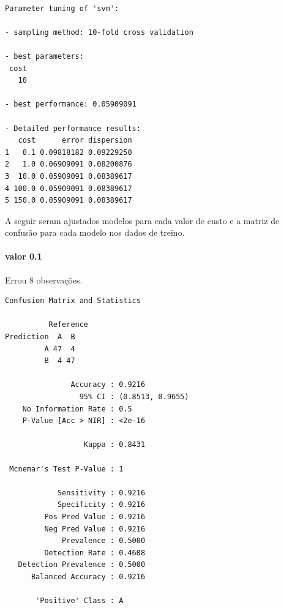 \documentclass[
  a4paperpaper,
]{article}
\let\oldparagraph\paragraph
\renewcommand{\paragraph}[1]{\oldparagraph{#1}\mbox{}}
\newenvironment{Shaded}{\begin{snugshade}}{\end{snugshade}}
\newcommand{\AttributeTok}[1]{\textcolor[rgb]{0.40,0.45,0.13}{#1}}
\newcommand{\FloatTok}[1]{\textcolor[rgb]{0.68,0.00,0.00}{#1}}
\newcommand{\FunctionTok}[1]{\textcolor[rgb]{0.28,0.35,0.67}{#1}}
\newcommand{\NormalTok}[1]{\textcolor[rgb]{0.00,0.23,0.31}{#1}}
\newcommand{\OtherTok}[1]{\textcolor[rgb]{0.00,0.23,0.31}{#1}}
\newcommand{\SpecialCharTok}[1]{\textcolor[rgb]{0.37,0.37,0.37}{#1}}
\newcommand{\StringTok}[1]{\textcolor[rgb]{0.13,0.47,0.30}{#1}}
\begin{document}
\begin{verbatim}

Parameter tuning of 'svm':

- sampling method: 10-fold cross validation 

- best parameters:
 cost
   10

- best performance: 0.05909091 

- Detailed performance results:
   cost      error dispersion
1   0.1 0.09818182 0.09229250
2   1.0 0.06909091 0.08200876
3  10.0 0.05909091 0.08389617
4 100.0 0.05909091 0.08389617
5 150.0 0.05909091 0.08389617
\end{verbatim}

A seguir seram ajustados modelos para cada valor de custo e a matriz de
confusão para cada modelo nos dados de treino.

\paragraph{valor 0.1}\label{valor-0.1}

Errou 8 observações.

\begin{Shaded}
\end{Shaded}

\begin{verbatim}
Confusion Matrix and Statistics

          Reference
Prediction  A  B
         A 47  4
         B  4 47
                                          
               Accuracy : 0.9216          
                 95% CI : (0.8513, 0.9655)
    No Information Rate : 0.5             
    P-Value [Acc > NIR] : <2e-16          
                                          
                  Kappa : 0.8431          
                                          
 Mcnemar's Test P-Value : 1               
                                          
            Sensitivity : 0.9216          
            Specificity : 0.9216          
         Pos Pred Value : 0.9216          
         Neg Pred Value : 0.9216          
             Prevalence : 0.5000          
         Detection Rate : 0.4608          
   Detection Prevalence : 0.5000          
      Balanced Accuracy : 0.9216          
                                          
       'Positive' Class : A               
                                          
\end{verbatim}
\end{document}
